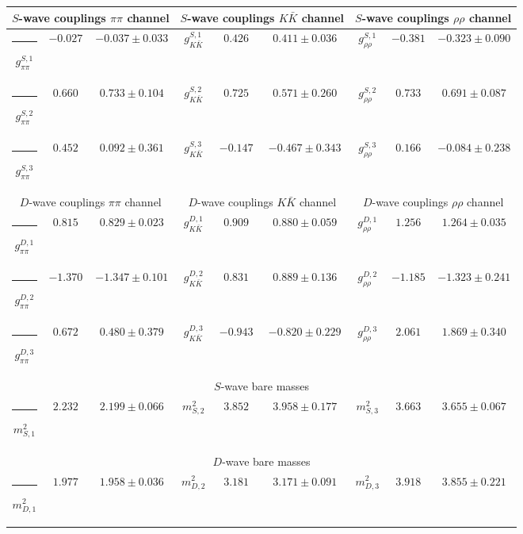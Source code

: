 \begin{table}[h]
\begin{ruledtabular}
\begin{tabular}{c c c c c c c c c}
\multicolumn{3}{c}{$S$-wave couplings $\pi \pi$ channel}  & \multicolumn{3}{c}{$S$-wave couplings $K  \bar K$ channel} & \multicolumn{3}{c}{$S$-wave couplings $\rho\rho$ channel} \\ \hline
\rule[-0.2cm]{-0.1cm}{.55cm} $g^{S,1}_{\pi\pi}$ & $-0.027$ & $-0.037 \pm 0.033$ & $g^{S,1}_{K\bar K}$ & $0.426$ & $0.411 \pm 0.036$ & $g^{S,1}_{\rho\rho}$ & $-0.381$ & $-0.323 \pm 0.090$ \\
\rule[-0.2cm]{-0.1cm}{.55cm} $g^{S,2}_{\pi\pi}$ & $0.660$ & $0.733 \pm 0.104$ & $g^{S,2}_{K\bar K}$ & $0.725$ & $0.571 \pm 0.260$ & $g^{S,2}_{\rho\rho}$ & $0.733$ & $0.691 \pm 0.087$ \\
\rule[-0.2cm]{-0.1cm}{.55cm} $g^{S,3}_{\pi\pi}$ & $0.452$ & $0.092 \pm 0.361$ & $g^{S,3}_{K\bar K}$ & $-0.147$ & $-0.467 \pm 0.343$ & $g^{S,3}_{\rho\rho}$ & $0.166$ & $-0.084 \pm 0.238$ \\
\hline 
\multicolumn{3}{c}{$D$-wave couplings $\pi \pi$ channel}  & \multicolumn{3}{c}{$D$-wave couplings $K  \bar K$ channel} & \multicolumn{3}{c}{$D$-wave couplings $\rho\rho$ channel} \\ \hline
\rule[-0.2cm]{-0.1cm}{.55cm} $g^{D,1}_{\pi\pi}$ & $0.815$ & $0.829 \pm 0.023$ & $g^{D,1}_{K\bar K}$ & $0.909$ & $0.880 \pm 0.059$ & $g^{D,1}_{\rho\rho}$ & $1.256$ & $1.264 \pm 0.035$ \\
\rule[-0.2cm]{-0.1cm}{.55cm} $g^{D,2}_{\pi\pi}$ & $-1.370$ & $-1.347 \pm 0.101$ & $g^{D,2}_{K\bar K}$ & $0.831$ & $0.889 \pm 0.136$ & $g^{D,2}_{\rho\rho}$ & $-1.185$ & $-1.323 \pm 0.241$ \\
\rule[-0.2cm]{-0.1cm}{.55cm} $g^{D,3}_{\pi\pi}$ & $0.672$ & $0.480 \pm 0.379$ & $g^{D,3}_{K\bar K}$ & $-0.943$ & $-0.820 \pm 0.229$ & $g^{D,3}_{\rho\rho}$ & $2.061$ & $1.869 \pm 0.340$ \\
\hline 
\multicolumn{9}{c}{$S$-wave bare masses}   \\ \hline
\rule[-0.2cm]{-0.1cm}{.55cm} $m^2_{S,1}$ & $2.232$ & $2.199 \pm 0.066$ & $m^2_{S,2}$ & $3.852$ & $3.958 \pm 0.177$ & $m^2_{S,3}$ & $3.663$ & $3.655 \pm 0.067$ \\
\hline 
\multicolumn{9}{c}{$D$-wave bare masses}   \\ \hline
\rule[-0.2cm]{-0.1cm}{.55cm} $m^2_{D,1}$ & $1.977$ & $1.958 \pm 0.036$ & $m^2_{D,2}$ & $3.181$ & $3.171 \pm 0.091$ & $m^2_{D,3}$ & $3.918$ & $3.855 \pm 0.221$ \\

\end{tabular}
\end{ruledtabular}
\end{table}
